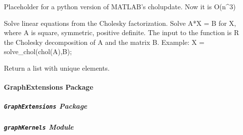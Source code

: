 \documentclass[letterpaper,10pt,english]{sphinxmanual}
\begin{document}

\begin{fulllineitems}
\label{pyGPs.Core:pyGPs.Core.tools.cholupdate}
Placeholder for a python version of MATLAB's cholupdate.  Now it is O(n\textasciicircum{}3)

\end{fulllineitems}


\begin{fulllineitems}
\label{pyGPs.Core:pyGPs.Core.tools.solve_chol}
Solve linear equations from the Cholesky factorization.
Solve A*X = B for X, where A is square, symmetric, positive definite. The
input to the function is R the Cholesky decomposition of A and the matrix B.
Example: X = solve\_chol(chol(A),B);

\end{fulllineitems}


\begin{fulllineitems}
\label{pyGPs.Core:pyGPs.Core.tools.unique}
Return a list with unique elements.

\end{fulllineitems}



\paragraph{GraphExtensions Package}
\label{pyGPs.GraphExtensions:graphextensions-package}\label{pyGPs.GraphExtensions::doc}

\subparagraph{\texttt{GraphExtensions} Package}
\label{pyGPs.GraphExtensions:id1}\label{pyGPs.GraphExtensions:module-pyGPs.GraphExtensions}

\subparagraph{\texttt{graphKernels} Module}
\label{pyGPs.GraphExtensions:graphkernels-module}\label{pyGPs.GraphExtensions:module-pyGPs.GraphExtensions.graphKernels}
\end{document}

